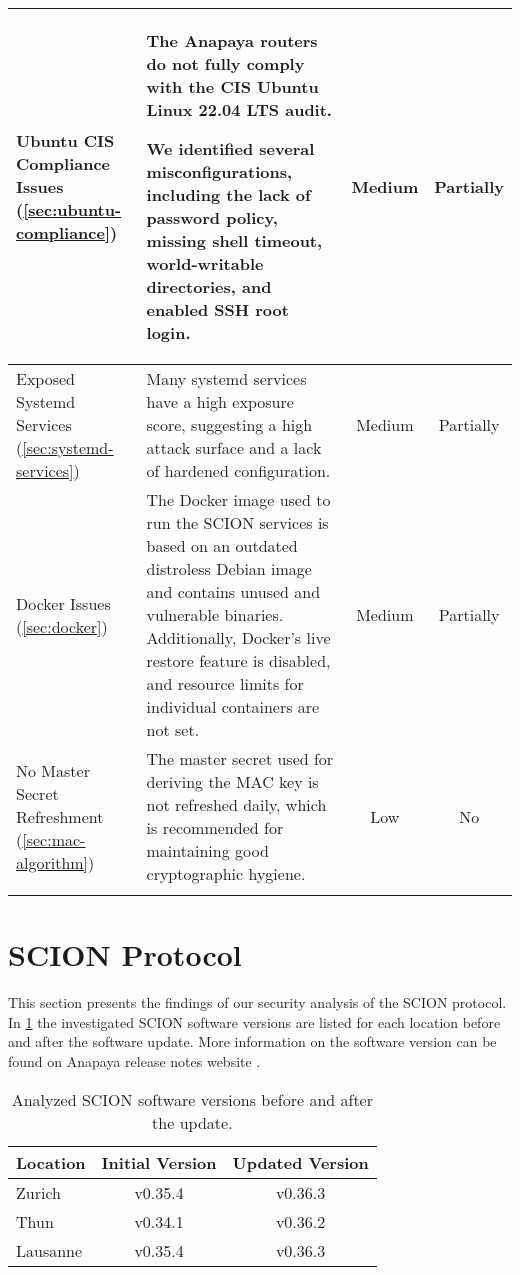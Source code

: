 \begin{tabularx}{\textwidth}{|C{3cm}|X|c|c|}
    Ubuntu CIS Compliance Issues (\cref{sec:ubuntu-compliance}) &
    The Anapaya routers do not fully comply with the CIS Ubuntu Linux 22.04 LTS audit.

    We identified several misconfigurations, including the lack of password policy, missing shell timeout, world-writable directories, and enabled SSH root login. &
    Medium &
    Partially
    \\ \hline

    Exposed Systemd Services (\cref{sec:systemd-services}) &
    Many systemd services have a high exposure score, suggesting a high attack surface and a lack of hardened configuration. &
    Medium &
    Partially
    \\ \hline

    Docker Issues (\cref{sec:docker}) &
    The Docker image used to run the SCION services is based on an outdated distroless Debian image and contains unused and vulnerable binaries.
    Additionally, Docker's live restore feature is disabled, and resource limits for individual containers are not set. &
    Medium &
    Partially
    \\ \hline

    No Master Secret Refreshment (\cref{sec:mac-algorithm}) &
    The master secret used for deriving the MAC key is not refreshed daily, which is recommended for maintaining good cryptographic hygiene. &
    Low &
    No
    \\ \hline


    \caption{Summary of Findings}
    \label{tab:findings_summary}
\end{tabularx}



\section{SCION Protocol}
\label{sec:findings:scion-protocol}
This section presents the findings of our security analysis of the SCION protocol.
In \cref{tab:software_scion_versions} the investigated SCION software versions are listed for each location before and after the software update.
More information on the software version can be found on Anapaya release notes website \cite{anapayaApplianceReleases}.

\begin{table}[H]
    \centering
    \begin{tabular}{|l|c|c|}
        \hline
        \textbf{Location} & \textbf{Initial Version} & \textbf{Updated Version} \\
        \hline
        Zurich & v0.35.4 & v0.36.3 \\
        \hline
        Thun & v0.34.1 & v0.36.2 \\
        \hline
        Lausanne & v0.35.4 & v0.36.3 \\
        \hline
    \end{tabular}
    \caption{Analyzed SCION software versions before and after the update.}
    \label{tab:software_scion_versions}
\end{table}

